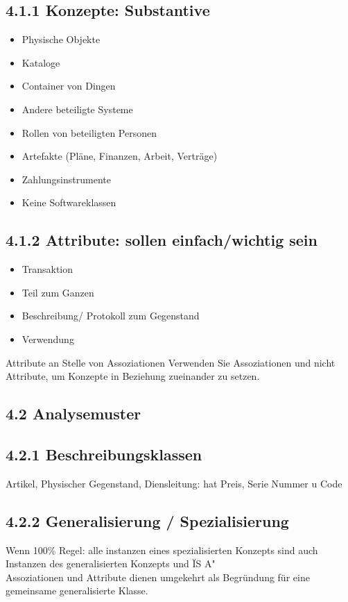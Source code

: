 \documentclass[10pt]{article}
\begin{document}
\subsection*{4.1.1 Konzepte: Substantive}
\begin{itemize}
  \item Physische Objekte
  \item Kataloge
  \item Container von Dingen
  \item Andere beteiligte Systeme
  \item Rollen von beteiligten Personen
  \item Artefakte (Pläne, Finanzen, Arbeit, Verträge)
  \item Zahlungsinstrumente
  \item Keine Softwareklassen
\end{itemize}

\subsection*{4.1.2 Attribute: sollen einfach/wichtig sein}
\begin{itemize}
  \item Transaktion
  \item Teil zum Ganzen
  \item Beschreibung/ Protokoll zum Gegenstand
  \item Verwendung
\end{itemize}

Attribute an Stelle von Assoziationen Verwenden Sie Assoziationen und nicht Attribute, um Konzepte in Beziehung zueinander zu setzen.

\subsection*{4.2 Analysemuster}
\subsection*{4.2.1 Beschreibungsklassen}
Artikel, Physischer Gegenstand, Diensleitung: hat Preis, Serie Nummer u Code

\subsection*{4.2.2 Generalisierung / Spezialisierung}
Wenn 100\% Regel: alle instanzen eines spezialisierten Konzepts sind auch Instanzen des generalisierten Konzepts und ÏS A"\\
Assoziationen und Attribute dienen umgekehrt als Begründung für eine gemeinsame generalisierte Klasse.
\end{document}
